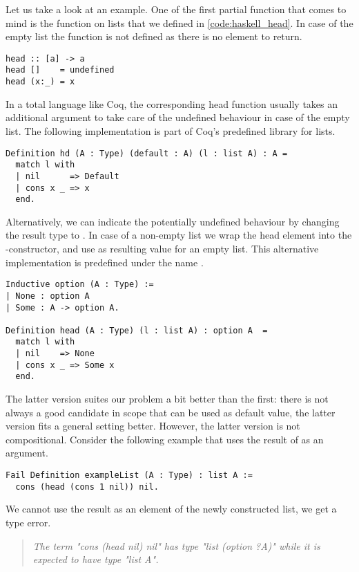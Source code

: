 Let us take a look at an example.
One of the first partial function that comes to mind is the  function on lists that we defined in \autoref{code:haskell_head}.
In case of the empty list the function is not defined as there is no element to return.

\begin{verbatim}
head :: [a] -> a
head []    = undefined
head (x:_) = x
\end{verbatim}

In a total language like Coq, the corresponding head function usually takes an additional argument to take care of the undefined behaviour in case of the empty list.
The following implementation is part of Coq's predefined library for lists.

\begin{verbatim}
Definition hd (A : Type) (default : A) (l : list A) : A = 
  match l with
  | nil      => Default
  | cons x _ => x
  end.
\end{verbatim}

Alternatively, we can indicate the potentially undefined behaviour by changing the result type to .
In case of a non\--empty list we wrap the head element into the \--constructor, and use  as resulting value for an empty list.
This alternative implementation is predefined under the name .

\begin{verbatim}
Inductive option (A : Type) :=
| None : option A
| Some : A -> option A.

Definition head (A : Type) (l : list A) : option A  = 
  match l with
  | nil    => None
  | cons x _ => Some x
  end.
\end{verbatim}

The latter version suites our problem a bit better than the first: there is not always a good candidate in scope that can be used as default value, the latter version fits a general setting better.
However, the latter version is not compositional.
Consider the following example that uses the result of  as an argument.

\begin{verbatim}
Fail Definition exampleList (A : Type) : list A :=
  cons (head (cons 1 nil)) nil.
\end{verbatim}

We cannot use the result as an element of the newly constructed list, we get a type error.

\begin{quote}
\emph{The term "cons (head nil) nil" has type "list (option ?A)" while it is expected to have type "list A".}
\end{quote}


